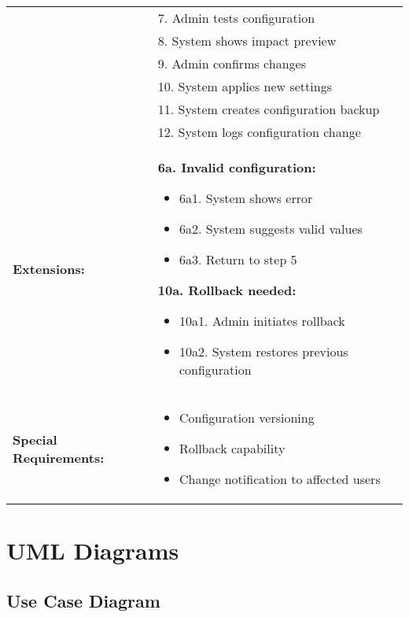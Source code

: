 \documentclass[12pt]{article}
\begin{document}
\begin{tabular}{|p{3cm}|p{11cm}|}
& 7. Admin tests configuration \\
& 8. System shows impact preview \\
& 9. Admin confirms changes \\
& 10. System applies new settings \\
& 11. System creates configuration backup \\
& 12. System logs configuration change \\
\hline
\textbf{Extensions:} & 
\textbf{6a. Invalid configuration:}
\begin{itemize}
    \item 6a1. System shows error
    \item 6a2. System suggests valid values
    \item 6a3. Return to step 5
\end{itemize}
\textbf{10a. Rollback needed:}
\begin{itemize}
    \item 10a1. Admin initiates rollback
    \item 10a2. System restores previous configuration
\end{itemize} \\
\hline
\textbf{Special Requirements:} & 
\begin{itemize}
    \item Configuration versioning
    \item Rollback capability
    \item Change notification to affected users
\end{itemize} \\
\hline
\end{tabular}




\section{UML Diagrams}

\subsection{Use Case Diagram}
\end{document}

